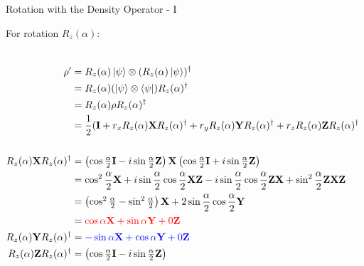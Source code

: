 \documentclass{beamer}
\begin{document}
\begin{frame}{Rotation with the Density Operator - I\tiny{\cite{rotationsonblochsphere}}}
  {\tiny
    For rotation $R_z(\alpha)$:
    \begin{columns}
    \begin{align*}
      \rho' &= R_z(\alpha)\ket{\psi} \otimes (R_z(\alpha)\ket{\psi})^{\dagger} \\
            &= R_z(\alpha)(\ket{\psi} \otimes \bra{\psi})R_z(\alpha)^{\dagger} \\
            &= R_z(\alpha) \rho R_z(\alpha)^{\dagger} \\
            &= \frac{1}2(\mathbf{I}  + r_x R_z(\alpha) \mathbf{X} R_z(\alpha)^{\dagger}
                                     + r_y R_z(\alpha) \mathbf{Y} R_z(\alpha)^{\dagger}
                                     + r_z R_z(\alpha) \mathbf{Z} R_z(\alpha)^{\dagger} \\
      \\
      R_z(\alpha) \mathbf{X} R_z(\alpha)^{\dagger}
            &=    \begin{pmatrix} \cos\frac{\alpha}2\mathbf{I} - i\sin\frac{\alpha}2 \mathbf{Z} \end{pmatrix}
                  \mathbf{X}
                  \begin{pmatrix} \cos\frac{\alpha}2\mathbf{I} + i\sin\frac{\alpha}2 \mathbf{Z} \end{pmatrix} \\
            &=    \cos^2\frac{\alpha}2 \mathbf{X}
                + i\sin\frac{\alpha}2 \cos\frac{\alpha}2 \mathbf{X}\mathbf{Z}
                - i\sin\frac{\alpha}2 \cos\frac{\alpha}2 \mathbf{Z}\mathbf{X}
                + \sin^2\frac{\alpha}2 \mathbf{Z}\mathbf{X}\mathbf{Z} \\
            &=    \begin{pmatrix} \cos^2\frac{\alpha}2 -  \sin^2\frac{\alpha}2 \end{pmatrix} \mathbf{X}
                + 2 \sin\frac{\alpha}2 \cos\frac{\alpha}2 \mathbf{Y} \\
            &= {\color{red}\cos\alpha \mathbf{X} + \sin\alpha \mathbf{Y}  + 0 \mathbf{Z}}\\
      R_z(\alpha) \mathbf{Y} R_z(\alpha)^{\dagger}
            &=    {\color{blue}- \sin\alpha \mathbf{X} +\cos\alpha \mathbf{Y} + 0 \mathbf{Z}}  \\
      R_z(\alpha) \mathbf{Z} R_z(\alpha)^{\dagger}
            &=    \begin{pmatrix} \cos\frac{\alpha}2\mathbf{I} - i\sin\frac{\alpha}2 \mathbf{Z} \end{pmatrix}

\end{align*}
\end{columns}}
\end{frame}
\end{document}
